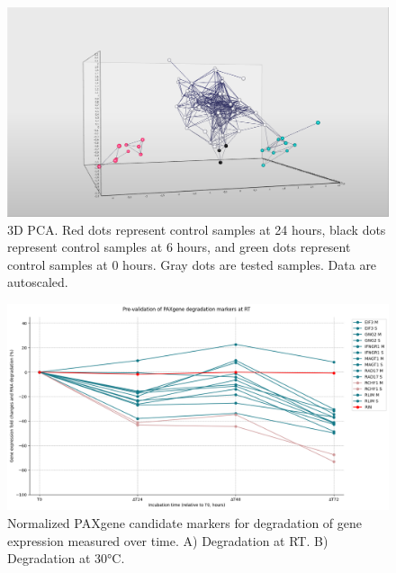 \documentclass[fleqn,10pt]{wlscirep}
\begin{document}
\begin{figure}[ht]
    \centering
    \includegraphics[width=\linewidth]{figure5}
    \caption{3D PCA. Red dots represent control samples at 24 hours, black dots represent control samples at 6 hours, and green dots represent control samples at 0 hours. Gray dots are tested samples. Data are autoscaled.}
    \label{fig:figure5}
    \end{figure}

\begin{figure}[ht]
    \centering
    \includegraphics[width=\linewidth]{figure6}
    \caption{Normalized PAXgene candidate markers for degradation of gene expression measured over time. A) Degradation at RT. B) Degradation at 30°C.}
    \label{fig:figure6}
    \end{figure}
\end{document}

